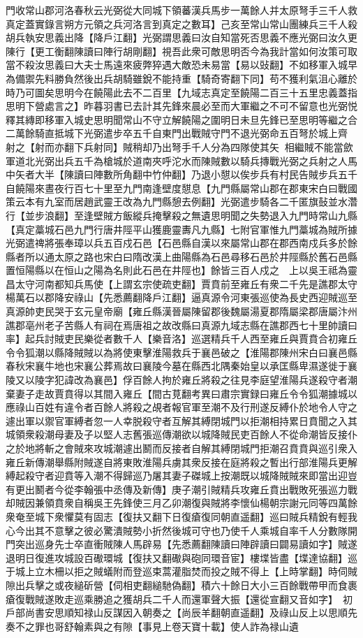 門收常山郡河洛春秋云光弼從大同城下領蕃漢兵馬步一萬餘人并太原弩手三千人救真定蓋實錄言朔方元領之兵河洛言到真定之數耳】己亥至常山常山團練兵三千人殺胡兵執安思義出降【降戶江翻】光弼謂思義曰汝自知當死否思義不應光弼曰汝久更陳行【更工衡翻陳讀曰陣行胡剛翻】視吾此衆可敵思明否今為我計當如何汝策可取當不殺汝思義曰大夫士馬遠來疲弊猝遇大敵恐未易當【易以䜴翻】不如移軍入城早為備禦先料勝負然後出兵胡騎雖銳不能持重【騎奇寄翻下同】苟不獲利氣沮心離於時乃可圖矣思明今在饒陽此去不二百里【九域志真定至饒陽二百三十五里忠義蓋指思明下營處言之】昨暮羽書已去計其先鋒來晨必至而大軍繼之不可不留意也光弼悦釋其縳即移軍入城史思明聞常山不守立解饒陽之圍明日未旦先鋒已至思明等繼之合二萬餘騎直抵城下光弼遣步卒五千自東門出戰賊守門不退光弼命五百弩於城上齊射之【射而亦翻下兵射同】賊稍却乃出弩手千人分為四隊使其矢相繼賊不能當歛軍道北光弼出兵五千為槍城於道南夾呼沱水而陳賊數以騎兵摶戰光弼之兵射之人馬中矢者大半【陳讀曰陣數所角翻中竹仲翻】乃退小憇以俟步兵有村民告賊步兵五千自饒陽來晝夜行百七十里至九門南逢壁度憇息【九門縣屬常山郡在郡東宋白曰戰國策云本有九室而居趙武靈王改為九門縣憩去例翻】光弼遣步騎各二千匿旗鼔並水濳行【並步浪翻】至逢壁賊方飯縱兵掩擊殺之無遺思明聞之失勢退入九門時常山九縣【真定藁城石邑九門行唐井陘平山獲鹿靈夀凡九縣】七附官軍惟九門藁城為賊所據光弼遣禆將張奉璋以兵五百戍石邑【石邑縣自漢以來屬常山郡在郡西南戍兵多於餘縣者所以通太原之路也宋白曰隋改漢上曲陽縣為石邑尋移石邑於井陘縣於舊石邑縣置恒陽縣以在恒山之陽為名則此石邑在井陘也】餘皆三百人戍之　上以吳王祗為靈昌太守河南都知兵馬使【上謂玄宗使疏吏翻】賈賁前至雍丘有衆二千先是譙郡太守楊萬石以郡降安祿山【先悉薦翻降戶江翻】逼真源令河東張巡使為長史西迎賊巡至真源帥吏民哭于玄元皇帝廟【雍丘縣漢晉屬陳留郡後魏屬湯夏郡隋屬梁郡唐屬汴州譙郡亳州老子苦縣人有祠在焉唐祖之故改縣曰真源九域志縣在譙郡西七十里帥讀曰率】起兵討賊吏民樂從者數千人【樂音洛】巡選精兵千人西至雍丘與賈賁合初雍丘令令狐潮以縣降賊賊以為將使東擊淮陽救兵于襄邑破之【淮陽郡陳州宋白曰襄邑縣春秋宋襄牛地也宋襄公葬焉故曰襄陵今墓在縣西北隅秦始皇以承匡縣卑濕遂徙于襄陵又以陵字犯諱改為襄邑】俘百餘人拘於雍丘將殺之往見李庭望淮陽兵遂殺守者潮棄妻子走故賈賁得以其間入雍丘【間古莧翻考異曰肅宗實録曰雍丘令令狐潮據城以應祿山百姓有違令者百餘人將殺之覘者報官軍至潮不及行刑遂反縛仆於地令人守之遽出軍以禦官軍縛者忽一人幸脱殺守者互解其縛閉城門以拒潮相持累日賁聞之入其城領衆殺潮母妻及子以堅人志舊張巡傳潮欲以城降賊民吏百餘人不從命潮皆反接仆之於地將斬之會賊來攻城潮遽出鬭而反接者自解其縛閉城門拒潮召賁賁與巡引衆入雍丘新傳潮舉縣附賊遂自將東敗淮陽兵虜其衆反接在庭將殺之暫出行部淮陽兵更解縛起殺守者迎賁等入潮不得歸巡乃屠其妻子磔城上按潮既以城降賊賊來即當出迎豈有更出鬭者今從李翰張中丞傳及新傳】庚子潮引賊精兵攻雍丘賁出戰敗死張巡力戰却賊因兼領賁衆自稱吳王先鋒使三月乙卯潮復與賊將李懷仙楊朝宗謝元同等四萬餘衆奄至城下衆懼莫有固志【復扶又翻下日復瘡復同朝直遥翻】巡曰賊兵精銳有輕我心今出其不意擊之彼必驚潰賊勢小折然後城可守也乃使千人乘城自率千人分數隊開門突出巡身先士卒直衝賊陳人馬辟易【先悉薦翻陳讀曰陣辟讀曰闢易讀如字】賊遂退明日復進攻城設百礮環城【復扶又翻礮與砲同環音宦】樓堞皆盡【堞達協翻】巡于城上立木柵以拒之賊蟻附而登巡束蒿灌脂焚而投之賊不得上【上時掌翻】時伺賊隙出兵擊之或夜縋斫營【伺相吏翻縋馳偽翻】積六十餘日大小三百餘戰帶甲而食裹瘡復戰賊遂敗走巡乘勝追之獲胡兵二千人而還軍聲大振【還從宣翻又音如字】　初戶部尚書安思順知禄山反謀因入朝奏之【尚辰羊翻朝直遥翻】及祿山反上以思順先奏不之罪也哥舒翰素與之有隙【事見上卷天寶十載】使人詐為禄山遺